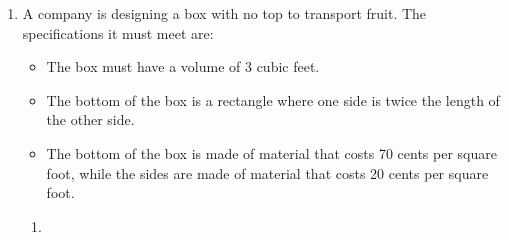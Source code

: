 \documentclass{article}
\begin{document}
\begin{enumerate}
\begin{enumerate}
\begin{solution}
      We also know that, at 8:00 am, the runner is running at 9 mph. That means the tangent line at $t = 8$ has slope 9, so its equation is $d - 10 = 9 (t - 8)$, or $d = 9 (t - 8) + 10$. The point on this line with $t = 8.5$ has $d = 9(0.5) + 10 = 14.5$. Here's a picture illustrating this approximation:
      \begin{center}
      \end{center}
      We can see from the graph that 14.5 is an upper bound for the actual value, since the tangent line is above the graph. 

      So, . In other words, the distance she has run by 8:30 am is between $13$ and $14.5$.
    \end{solution}
  \end{enumerate}

\item \label{fall2018-premidterm-practice3-3-modified} 

  A company is designing a box with no top to transport fruit. The specifications it must meet are:
  \begin{itemize}[nosep]
  \item The box must have a volume of 3 cubic feet.
  \item The bottom of the box is a rectangle where one side is twice the length of the other side.
  \item The bottom of the box is made of material that costs 70 cents per square foot, while the sides are made of material that costs 20 cents per square foot.
  \end{itemize}

  \begin{enumerate}
  \item


\end{enumerate}
\end{enumerate}
\end{document}
